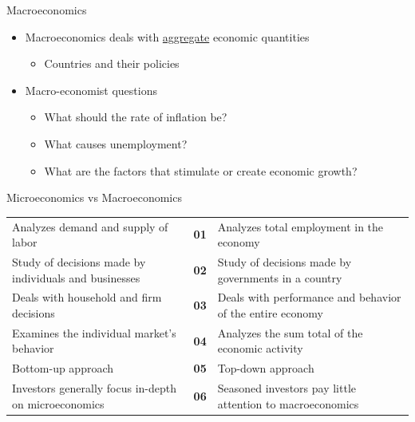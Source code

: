 \documentclass[aspectratio=1610,10pt]{beamer}
\begin{document}
\begin{frame}{Macroeconomics}
  \begin{itemize}
    \item Macroeconomics deals with \underline{aggregate} economic quantities
    \begin{itemize}\item Countries and their policies\end{itemize}
    \item Macro-economist questions
    \begin{itemize}
      \item What should the rate of inflation be?
      \item What causes unemployment?
      \item What are the factors that stimulate or create economic growth?
    \end{itemize}
  \end{itemize}
\end{frame}

\begin{frame}{Microeconomics vs Macroeconomics}
  \small
  \renewcommand{\arraystretch}{1.35}
  \begin{center}
  \begin{tabular}{>{\raggedright\arraybackslash}p{}c>{\raggedleft\arraybackslash}p{}}
    Analyzes demand and supply of labor & \cellcolor{moldedark}\textcolor{accentyellow}{\textbf{01}} & Analyzes total employment in the economy \\
    Study of decisions made by individuals and businesses & \cellcolor{moldedark}\textcolor{accentyellow}{\textbf{02}} & Study of decisions made by governments in a country \\
    Deals with household and firm decisions & \cellcolor{moldedark}\textcolor{accentyellow}{\textbf{03}} & Deals with performance and behavior of the entire economy \\
    Examines the individual market's behavior & \cellcolor{moldedark}\textcolor{accentyellow}{\textbf{04}} & Analyzes the sum total of the economic activity \\
    Bottom-up approach & \cellcolor{moldedark}\textcolor{accentyellow}{\textbf{05}} & Top-down approach \\
    Investors generally focus in-depth on microeconomics & \cellcolor{moldedark}\textcolor{accentyellow}{\textbf{06}} & Seasoned investors pay little attention to macroeconomics \\
  \end{tabular}
  \end{center}
\end{frame}
\end{document}

